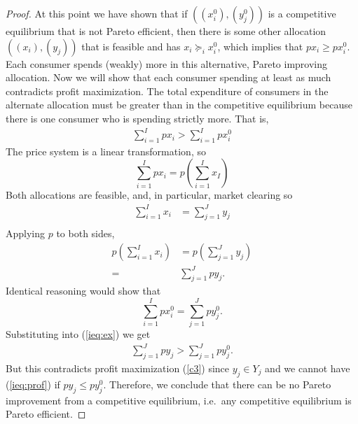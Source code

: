 \documentclass[12pt,reqno]{amsart}
\theoremstyle{definition}
\newcommand{\prefeq}{\succeq}
\begin{document}
\begin{proof}
  At this point we have shown that if $((x_i^0),(y_j^0))$ is a
  competitive equilibrium that is not Pareto efficient, then there is
  some other allocation $((x_i),(y_j))$ that is feasible and has $x_i
  \prefeq_i x_i^0$, which implies that $p x_i \geq p x_i^0$. Each
  consumer spends (weakly) more in this alternative, Pareto improving
  allocation. Now we will show that each consumer spending at least as
  much contradicts profit maximization. The total expenditure of
  consumers in the alternate allocation must be greater than in the
  competitive equilibrium because there is one consumer who is
  spending strictly more. That is,
  \begin{align}
    \sum_{i=1}^I p x_i > \sum_{i=1}^I p x_i^0 \label{ieq:ex}
  \end{align}
  The price system is a linear transformation, so
  \[ \sum_{i=1}^I p x_i = p \left(\sum_{i=1}^I x_I \right) \]
  Both allocations are feasible, and, in particular, market clearing
  so
  \begin{align*}
    \sum_{i=1}^I x_i & = \sum_{j=1}^J y_j \\
  \end{align*}
  Applying $p$ to both sides, 
  \begin{align*}
    p\left( \sum_{i=1}^I x_i\right) & = p\left( \sum_{j=1}^J y_j
    \right) \\ 
    = & \sum_{j=1}^J p y_j.
  \end{align*}
  Identical reasoning would show that 
  \[ \sum_{i=1}^I p x_i^0 = \sum_{j=1}^J p y_j^0. \]
  Substituting into (\ref{ieq:ex}) we get
  \begin{align}
    \sum_{j=1}^J p y_j > \sum_{j=1}^J p y_j^0. \label{ieq:prof}
  \end{align}
  But this contradicts profit maximization (\ref{c3}) since $y_j \in
  Y_j$ and we cannot have (\ref{ieq:prof}) if $p y_j \leq p y_j^0$. 
  Therefore, we conclude that there can be no Pareto improvement from
  a competitive equilibrium, i.e.\ any competitive equilibrium is
  Pareto efficient.
\end{proof}
\end{document}
